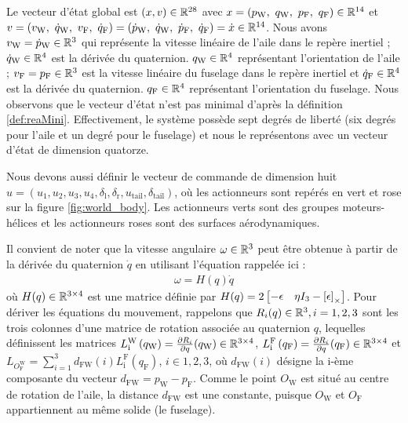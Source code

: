 Le vecteur d'état global est $(x,v) \in {\mathbb R}^{28}$ avec $x=(p_{\text{W}},~q_{\text{W}},~p_{\text{F}},~q_{\text{F}}) \in {\mathbb R}^{14}$ et $v=(v_{\text{W}},~\dot{q}_{\text{W}},~v_{\text{F}},~\dot{q}_{\text{F}}) = (\dot{p}_{\text{W}},~\dot{q}_{\text{W}},~\dot{p}_{\text{F}},~\dot{q}_{\text{F}})=\dot{x} \in {\mathbb R}^{14}$. Nous avons $v_{\text{W}} = \dot{p}_{\text{W}} \in {\mathbb R}^{3}$ qui représente la vitesse linéaire de l'aile dans le repère inertiel ; $\dot{q}_{\text{W}} \in {\mathbb R}^{4}$  est la dérivée du quaternion. $q_{\text{W}} \in {\mathbb R}^{4}$ représentant l'orientation de l'aile ; $v_{\text{F}} =p_{\text{F}} \in {\mathbb R}^{3}$  est la vitesse linéaire du fuselage dans le repère inertiel et $\dot{q}_{\text{F}} \in {\mathbb R}^{4}$  est la dérivée du quaternion. $q_{\text{F}} \in {\mathbb R}^{4}$ représentant l'orientation du fuselage. Nous observons que le vecteur d'état n'est pas minimal d'après la définition \ref{def:reaMini}. Effectivement, le système possède sept degrés de liberté (six degrés pour l'aile et un degré pour le fuselage) et nous le représentons avec un vecteur d'état de dimension quatorze.

Nous devons aussi définir le vecteur de commande de dimension huit $u = (u_{1},u_{2},u_{3},u_{4},\delta_{\text{l}},\delta_{\text{r}},u_{\text{tail}},\delta_{\text{tail}})$, où les actionneurs sont repérés en vert et rose sur la figure \ref{fig:world_body}. Les actionneurs verts sont des groupes moteurs-hélices et les actionneurs roses sont des surfaces aérodynamiques. 

Il convient de noter que la vitesse angulaire $\omega \in {\mathbb R}^{3}$ peut être obtenue à partir de la dérivée du quaternion $\dot{q}$ en utilisant l'équation \cite[équation (2.7)]{udwadia-schutte} rappelée ici : 
\begin{align*}
    \omega = H(q) \dot{q} 
\end{align*}
où $H(q) \in {\mathbb R}^{3\times4}$ est une matrice définie par $H(q) = 2\begin{bmatrix}-\epsilon & \eta I_{3} - \left[\epsilon\right]_{\times}\end{bmatrix}$.
Pour dériver les équations du mouvement, rappelons que  $R_{i}(q) \in {\mathbb R}^{3}, i = 1,2,3$ sont les trois colonnes d'une matrice de rotation associée au quaternion $q$, lequelles définissent les matrices $L_{\text{i}}^{\text{W}} \left( q_{\text{W}} \right) = \frac{\partial R_{i}}{\partial q}(q_{\text{W}}) \in {\mathbb R}^{3\times4}$, 
$L_{\text{i}}^{\text{F}} \left( q_{\text{F}} \right) = \frac{\partial R_{i}}{\partial q}(q_{\text{F}}) \in {\mathbb R}^{3\times4}$ et
$L_{O_{\text{F}}^{\text{W}}} = \sum_{i=1}^{3} d_{\text{FW}}(i) L_{\text{i}}^{\text{F}} (q_{\text{F}})$, $i \in {1,2,3}$, où $d_{\text{FW}}(i)$ désigne la i-ème composante du vecteur $d_{\text{FW}} = p_{\text{W}} - p_{\text{F}}$. Comme le point $O_{\text{W}}$ est situé au centre de rotation de l'aile, la distance $d_{\text{FW}}$ est une constante, puisque $O_{\text{W}}$ et $O_{\text{F}}$ appartiennent au même solide (le fuselage).

